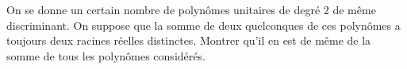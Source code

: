 On se donne un certain nombre de polynômes unitaires de degré $2$ de même discriminant. On suppose que la somme de deux quelconques de ces polynômes a toujours deux racines réelles distinctes. Montrer qu'il en est de même de la somme de tous les polynômes considérés.